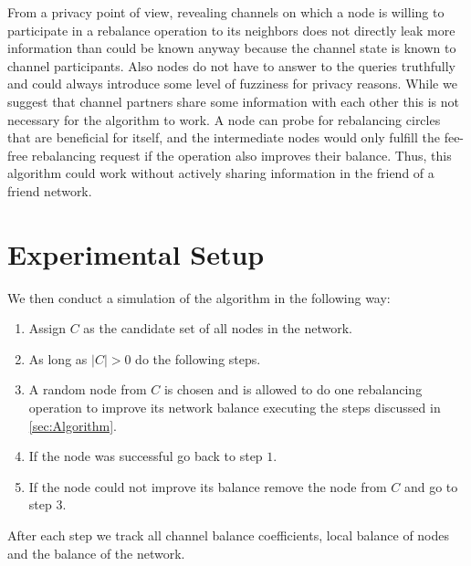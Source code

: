 \documentclass[a4paper]{paper}
\begin{document}
From a privacy point of view, revealing channels on which a node is willing to participate in a rebalance operation to its neighbors does not directly leak more information than could be known anyway because the channel state is known to channel participants.
Also nodes do not have to answer to the queries truthfully and could always introduce some level of fuzziness for privacy reasons. 
While we suggest that channel partners share some information with each other this is not necessary for the algorithm to work.
A node can probe for rebalancing circles that are beneficial for itself, 
and the intermediate nodes would only fulfill the fee-free rebalancing request if the operation also improves their balance. 
Thus, this algorithm could work without actively sharing information in the friend of a friend network.



\section{Experimental Setup}
\label{sec:setup}

We then conduct a simulation of the algorithm in the following way:
\begin{enumerate}
\item Assign $C$ as the candidate set of all nodes in the network.
\item As long as $|C| > 0$ do the following steps.
\item A random node from $C$ is chosen and is allowed to do one rebalancing operation to improve its network balance executing the steps discussed in \cref{sec:Algorithm}.
\item If the node was successful go back to step $1$.
\item If the node could not improve its balance remove the node from $C$ and go to step $3$.
\end{enumerate}

After each step we track all channel balance coefficients, local balance of nodes and the balance of the network.
\end{document}
